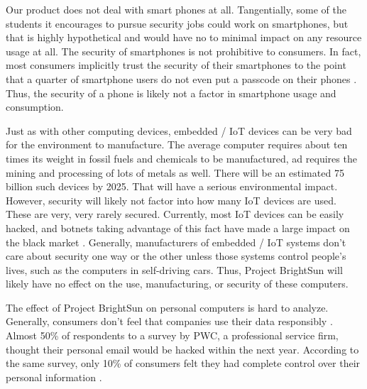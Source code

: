 \documentclass[openright]{report}
\begin{document}
\par Our product does not deal with smart phones at all. Tangentially, some of the students it encourages to pursue security jobs could work on smartphones, but that is highly hypothetical and would have no to minimal impact on any resource usage at all. The security of smartphones is not prohibitive to consumers. In fact, most consumers implicitly trust the security of their smartphones to the point that a quarter of smartphone users do not even put a passcode on their phones \cite{phone_security}. Thus, the security of a phone is likely not a factor in smartphone usage and consumption.

\par Just as with other computing devices, embedded / IoT devices can be very bad for the environment to manufacture. The average computer requires about ten times its weight in fossil fuels and chemicals to be manufactured, ad requires the mining and processing of lots of metals as well. There will be an estimated 75 billion such devices by 2025\cite{iot_numbers}. That will have a serious environmental impact. However, security will likely not factor into how many IoT devices are used. These are very, very rarely secured. Currently, most IoT devices can be easily hacked, and botnets taking advantage of this fact have made a large impact on the black market \cite{iot_security}\cite{iot_botnet}. Generally, manufacturers of embedded / IoT systems don't care about security one way or the other unless those systems control people's lives, such as the computers in self-driving cars. Thus, Project BrightSun will likely have no effect on the use, manufacturing, or security of these computers.

\par The effect of Project BrightSun on personal computers is hard to analyze. Generally, consumers don't feel that companies use their data responsibly \cite{security_survey_pew}. Almost 50\% of respondents to a survey by PWC, a professional service firm, thought their personal email would be hacked within the next year. According to the same survey, only 10\% of consumers felt they had complete control over their personal information \cite{security_survey_pwc}. 
\end{document}
